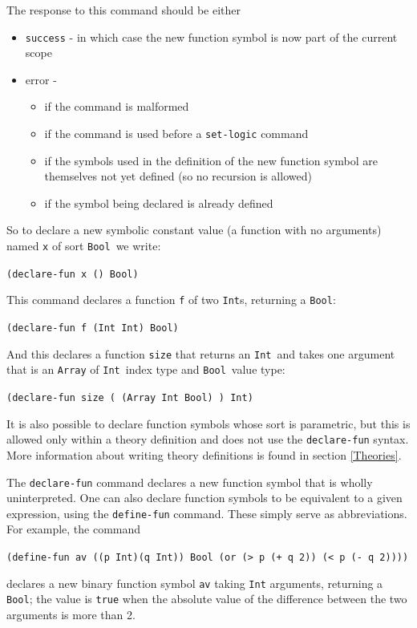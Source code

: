 \documentclass[12pt,oneside]{report}
\newcommand{\Bool}{{\tt Bool}}
\newcommand{\Int}{{\tt Int}}
\newcommand{\nospace}{\setlength{\itemsep}{0in}\setlength{\parsep}{0in}\setlength{\parskip}{0in}\setlength{\topsep}{0in}}
\begin{document}
The response to this command should be either
\begin{itemize} \nospace
\item {\tt success} - in which case the new function symbol is now part of the current scope
\item error - 
\begin{itemize} \nospace
\item if the command is malformed
\item if the command is used before a {\tt set-logic} command
\item if the symbols used in the definition of the new function symbol are themselves not yet defined (so no recursion is allowed)
\item if the symbol being declared is already defined
\end{itemize}
\end{itemize}


So to declare a new symbolic constant value (a function with no arguments) named {\tt x} of sort \Bool~we write:\\
\centerline{\tt (declare-fun x () Bool)}
This command declares a function {\tt f} of two \Int s, returning a \Bool:\\
\centerline{\tt (declare-fun f (Int Int) Bool)}
And this declares a function {\tt size} that returns an \Int~and takes one argument
that is an {\tt Array} of \Int~index type and \Bool~value type:\\
\centerline{\tt (declare-fun size ( (Array Int Bool) ) Int)}

It is also possible to declare function symbols whose sort is parametric, but this is allowed only within a theory definition and does not use the {\tt declare-fun} syntax.  More information about writing theory definitions is found in section \ref{Theories}.

The {\tt declare-fun} command declares a new function symbol that is wholly uninterpreted. One can also declare function symbols to be
equivalent to a given expression, using the {\tt define-fun} command. These simply serve as abbreviations.  For example, the command\\
\centerline{\tt (define-fun av ((p Int)(q Int)) Bool (or (> p (+ q 2)) (< p (- q 2))))}
declares a new binary function symbol {\tt av} taking {\tt Int} arguments, returning a {\tt Bool}; the value is {\tt true} when the absolute value of the difference
between the two arguments is more than 2.
\end{document}
